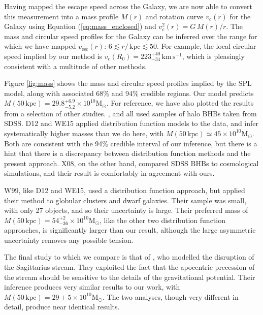 \documentclass[useAMS,twocolumn,usenatbib]{mn2e}
\def\kpc{{\,\mathrm{kpc}}}
\def\kms{{\,\mathrm{km\,s^{-1}}}}
\def\vesc{{v_\mathrm{esc}}}
\begin{document}
Having mapped the escape speed across the Galaxy, we are now able to convert this measurement into a mass profile $M(r)$ and rotation curve $v_c(r)$ for the Galaxy using Equation (\ref{eq:mass_enclosed}) and $v_c^2(r) = G\,M(r)/r$. 
The mass and circular speed profiles for the Galaxy can be inferred over the range for which we have mapped $\vesc(r)$: $6 \lesssim r/\kpc \lesssim 50$.
For example, the local circular speed implied by our method is $v_c(R_0) = 223^{+40}_{-34}\kms$, which is pleasingly consistent with a multitude of other methods.

Figure \ref{fig:mass} shows the mass and circular speed profiles implied by the SPL model, along with associated 68\% and 94\% credible regions. 
Our model predicts $M(50\kpc)=29.8^{+6.9}_{-5.2} \times 10^{10}\mathrm{M}_\odot$. 
For reference, we have also plotted the results from a selection of other studies. 
\citet[][X08]{Xu08}, \citet[][D12]{De12} and \citet[][WE15]{Wi15} all used samples of halo BHBs taken from SDSS. 
D12 and WE15 applied distribution function models to the data, and infer systematically higher masses than we do here, with $M(50\kpc) \simeq 45\times10^{10}\mathrm{M}_\odot$.  
Both are consistent with the 94\% credible interval of our inference, but there is a hint that there is a discrepancy between distribution function methods and the present approach.
X08, on the other hand, compared SDSS BHBs to cosmological simulations, and their result is comfortably in agreement with ours.

W99, like D12 and WE15, used a distribution function approach, but applied their method to globular clusters and dwarf galaxies. 
Their sample was small, with only 27 objects, and so their uncertainty is large. 
Their preferred mass of $M(50\kpc)=54^{+2}_{-36}\times 10^{10}\mathrm{M}_\odot$, like the other two distribution function approaches, is significantly larger than our result, although the large asymmetric uncertainty removes any possible tension.

The final study to which we compare is that of \citet[][G14]{Gi14}, who modelled the disruption of the Sagittarius stream. 
They exploited the fact that the apocentric precession of the stream should be sensitive to the details of the gravitational potential. 
Their inference produces very similar results to our work, with $M(50\kpc)=29\pm5\times 10^{10}\mathrm{M}_\odot$. 
The two analyses, though very different in detail, produce near identical results.
\end{document}
